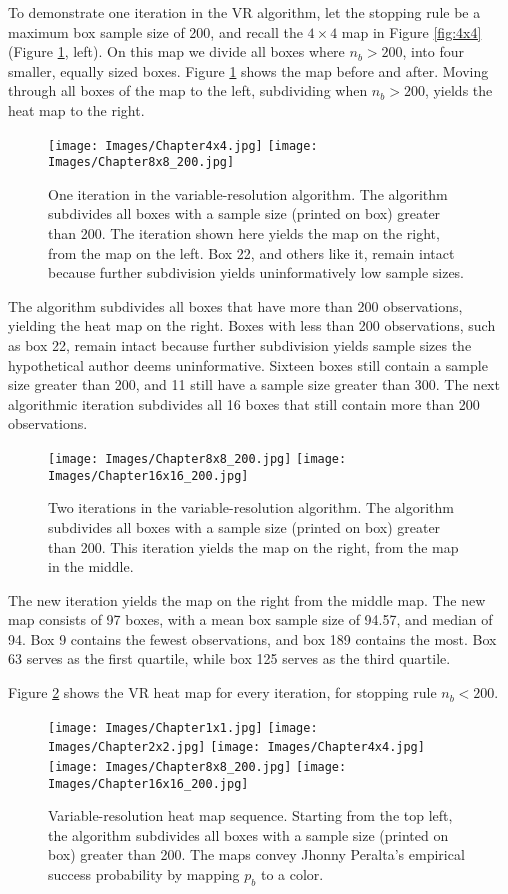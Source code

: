 To demonstrate one iteration in the VR algorithm, let the stopping rule be a maximum box sample size of 200, and recall the $4 \times 4$ map in Figure \ref{fig:4x4} (Figure \ref{fig:4x4and8x8}, left). On this map we divide all boxes where $n_{b} > 200$, into four smaller, equally sized boxes. Figure \ref{fig:4x4and8x8} shows the map before and after. Moving through all boxes of the map to the left, subdividing when $n_{b} > 200$, yields the heat map to the right.
        \begin{figure}[H]
      	\centering
      	\texttt{[image: Images/Chapter4x4.jpg]} 
      	\texttt{[image: Images/Chapter8x8\_200.jpg]} 
      	\caption{One iteration in the variable-resolution algorithm. The algorithm subdivides all boxes with a sample size (printed on box) greater than 200. The iteration shown here yields the map on the right, from the map on the left. Box 22, and others like it, remain intact because further subdivision yields uninformatively low sample sizes.}
      	\label{fig:4x4and8x8}
      	\end{figure} 
The algorithm subdivides all boxes that have more than 200 observations, yielding the heat map on the right. Boxes with less than 200 observations, such as box 22, remain intact because further subdivision yields sample sizes the hypothetical author deems uninformative. Sixteen boxes still contain a sample size greater than 200, and 11 still have a sample size greater than 300. The next algorithmic iteration subdivides all 16 boxes that still contain more than 200 observations. 
        \begin{figure}[H]
      	\centering
      	\texttt{[image: Images/Chapter8x8\_200.jpg]} 
      	\texttt{[image: Images/Chapter16x16\_200.jpg]} 
      	\caption{Two iterations in the variable-resolution algorithm. The algorithm subdivides all boxes with a sample size (printed on box) greater than 200. This iteration yields the map on the right, from the map in the middle.}
      	\end{figure}
The new iteration yields the map on the right from the middle map. The new map consists of 97 boxes, with a mean box sample size of 94.57, and median of 94. Box 9 contains the fewest observations, and box 189 contains the most. Box 63 serves as the first quartile, while box 125 serves as the third quartile. 

Figure \ref{fig:allvr} shows the VR heat map for every iteration, for stopping rule $n_{b} < 200$.
        \begin{figure}[H]
      	\centering
      	\texttt{[image: Images/Chapter1x1.jpg]}
      	\texttt{[image: Images/Chapter2x2.jpg]}
      	\texttt{[image: Images/Chapter4x4.jpg]}
      	\texttt{[image: Images/Chapter8x8\_200.jpg]} 
      	\texttt{[image: Images/Chapter16x16\_200.jpg]} 
      	\caption{Variable-resolution heat map sequence. Starting from the top left, the algorithm subdivides all boxes with a sample size (printed on box) greater than 200. The maps convey Jhonny Peralta's empirical success probability by mapping $p_{b}$ to a color.}
      	\label{fig:allvr}
      	\end{figure}
      	
